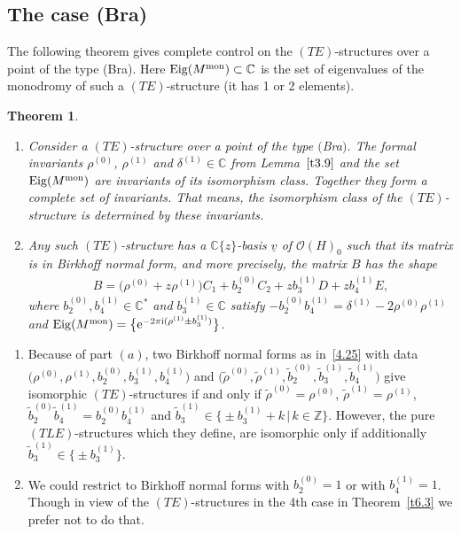\documentclass[10pt,a4paper]{amsart}
\numberwithin{equation}{section}
\numberwithin{figure}{section}
\newcommand{\Z}{{\mathbb Z}}
\newcommand{\C}{{\mathbb C}}
\newcommand{\OO}{{\mathcal O}}
\newcommand{\www}{\widetilde}
\newcommand{\uuuu}{\underline}
\DeclareMathOperator{\Eig}{Eig}
\newtheorem{Theorem}{Theorem}[section]
\begin{document}
\subsection{The case (Bra)}%


The following theorem gives complete control on the
$(TE)$-structures over a point of the type (Bra).
Here $\Eig(M^{\rm mon})\subset\C$ is the set of eigenvalues
of the monodromy of such a $(TE)$-structure
(it has 1 or 2 elements).


\begin{Theorem}\label{t4.11}\quad

\begin{enumerate}\itemsep=0pt
\item[$(a)$] Consider a $(TE)$-structure over a point of the type $($Bra$)$.
The formal invariants $\rho^{(0)}$, $\rho^{(1)}$ and
$\delta^{(1)}\in\C$ from Lemma~$\ref{t3.9}$ and the
set $\Eig(M^{\rm mon})$
are invariants of its isomorphism class.
Together they form a complete set of invariants.
That means, the isomorphism class of the $(TE)$-structure
is determined by these invariants.

\item[$(b)$] Any such $(TE)$-structure has a $\C\{z\}$-basis
$\uuuu{v}$ of $\OO(H)_0$ such that its matrix is
in Birkhoff normal form, and more precisely, the matrix
$B$ has the shape
\begin{gather}\label{4.25}
B= \big(\rho^{(0)}+z\rho^{(1)}\big)C_1 + b_2^{(0)}C_2 + zb_3^{(1)}D+ zb_4^{(1)}E,
\end{gather}
where $b_2^{(0)},b_4^{(1)}\in\C^*$ and $b_3^{(1)}\in\C$ satisfy
$-b_2^{(0)}b_4^{(1)}=\delta^{(1)}-2\rho^{(0)}\rho^{(1)}$ and
$\Eig(M^{\rm mon})=\big\{{\rm e}^{-2\pi {\rm i} (\rho^{(1)}\pm b_3^{(1)})}\big\}$.
\end{enumerate}
\end{Theorem}



\begin{Remarks}\label{t4.12}\quad
\begin{enumerate}\itemsep=0pt
\item[$(i)$] Because of part $(a)$, two Birkhoff normal forms as in~\eqref{4.25}
with data $\big(\rho^{(0)},\rho^{(1)},b_2^{(0)},\allowbreak b_3^{(1)},b_4^{(1)}\big)$
and $\big(\www\rho^{(0)},\www\rho^{(1)},\www b_2^{(0)},\www b_3^{(1)}, \www b_4^{(1)}\big)$
give isomorphic $(TE)$-structures
if and only if $\www \rho^{(0)}=\rho^{(0)}$,
$\www\rho^{(1)}=\rho^{(1)}$,
$\www b_2^{(0)}\www b_4^{(1)}=b_2^{(0)} b_4^{(1)}$
and $\www b_3^{(1)}\in \big\{{\pm} b_3^{(1)}+k\,|\, k\in\Z\big\}$.
However, the pure $(TLE)$-structures which they
define, are isomorphic only if additionally
$\www b_3^{(1)}\in\big\{{\pm} b_3^{(1)}\big\}$.

\item[$(ii)$] We could restrict to Birkhoff normal forms with
$b_2^{(0)}=1$ or with $b_4^{(1)}=1$. Though in view of the
$(TE)$-structures in the 4th case in Theorem~\ref{t6.3}
we prefer not to do that.
\end{enumerate}
\end{Remarks}
\end{document}
